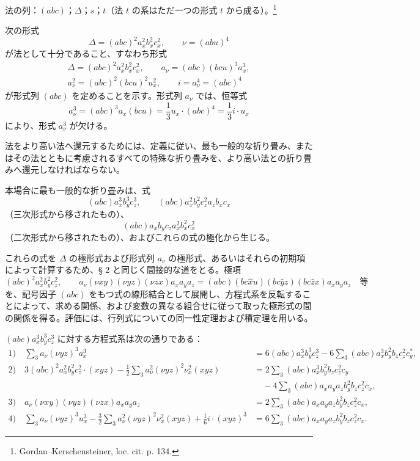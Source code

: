 \documentclass[11pt]{article}
\newcommand{\A}{\Delta}
\begin{document}
法の列：$(abc)$；$\A$；$s$；$t$（法 $t$ の系はただ一つの形式 $t$ から成る）。\footnote{Gordan--Kerschensteiner, loc. cit. p. 134.}

次の形式
\[
\A=(abc)^2a_x^2b_x^2c_x^2,\qquad \nu=(abu)^4
\]
が法として十分であること、すなわち形式
\[
\begin{gathered}
\A=(abc)^2a_x^2b_x^2c_x^2,\qquad
a_\nu=(abc)(bcu)^3a_x^3,\\
a_\nu^2=(abc)^2(bcu)^2u_x^2,\qquad
i=a_\nu^4=(abc)^4
\end{gathered}
\]
が形式列 $(abc)$ を定めることを示す。形式列 $a_\nu$ では、恒等式
\[
a_\nu^3=(abc)^3a_x(bcu)=\frac13 u_x\cdot(abc)^4=\frac13 i\cdot u_x
\]
により、形式 $a_\nu^3$ が欠ける。

法をより高い法へ還元するためには、定義に従い、最も一般的な折り畳み、またはその法とともに考慮されるすべての特殊な折り畳みを、より高い法との折り畳みへ還元しなければならない。

本場合に最も一般的な折り畳みは、式
\[
(abc)a_x^3b_y^3c_z^3,\qquad
(abc)a_x^2b_y^2c_z^2a_zb_xc_x
\]
（三次形式から移されたもの）、
\[
(abc)a_xb_yc_za_x^2b_x^2c_x^2
\]
（二次形式から移されたもの）、およびこれらの式の極化から生じる。

これらの式を $\A$ の極形式および形式列 $a_\nu$ の極形式、あるいはそれらの初期項によって計算するため、§ 2 と同じく間接的な道をとる。極項
\[
(abc)^2a_x^2b_y^2c_z^2,\qquad
a_\nu(\nu xy)(\nu yz)(\nu zx)a_xa_ya_z
=(abc)(bc\widehat{x}u)(bc\widehat{y}z)(bc\widehat{z}x)a_xa_ya_z\quad\text{等}
\]
を、記号因子 $(abc)$ をもつ式の線形結合として展開し、方程式系を反転することによって、求める関係、および変数の異なる組合せに従って取った極形式の間の関係を得る。評価には、行列式についての同一性定理および積定理を用いる。

$(abc)a_x^3b_y^3c_z^3$ に対する方程式系は次の通りである：
\begingroup\small
\[
\begin{aligned}
1)\quad
\sum_3 a_\nu(\nu yz)^3a_x^3
&=6(abc)a_x^3b_y^3c_z^3
-6\sum_3(abc)a_x^3b_y^2b_zc_z^2c_y^{*},\\[0.4em]
2)\quad
3(abc)^2a_x^2b_y^2c_z^2\cdot(xyz)
-\frac12\sum_3 a_\nu^2(\nu yz)^2\nu_x^2(xyz)
&=2\sum_3(abc)a_x^3b_y^2b_zc_z^2c_y\\
&\quad-4\sum_3(abc)a_xa_ya_zb_y^2b_zc_z^2c_x,\\[0.4em]
3)\quad
a_\nu(\nu xy)(\nu yz)(\nu zx)a_xa_ya_z
&=2\sum_3(abc)a_xa_ya_zb_y^2b_zc_z^2c_x,\\[0.4em]
4)\quad
\sum_3 a_\nu(\nu yz)^3u_x^3
-\frac32\sum_3 a_\nu^2(\nu yz)^2\nu_x^2(xyz)
+\frac16 i\cdot(xyz)^3
&=6\sum_3(abc)a_xa_ya_zb_y^2b_zc_z^2c_x.
\end{aligned}
\]
\endgroup
\end{document}
